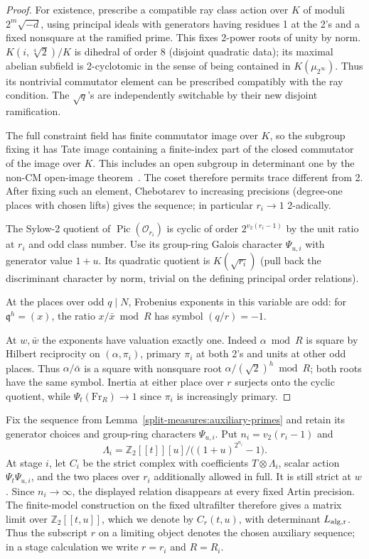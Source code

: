 \begin{proof}
For existence, prescribe a compatible ray class action over \(K\) of moduli \(2^m\sqrt{-d}\), using principal ideals with generators having residues 1 at the 2's and a fixed nonsquare at the ramified prime. This fixes 2-power roots of unity by norm. \(K(i,\sqrt[4]{2})/K\) is dihedral of order 8 (disjoint quadratic data); its maximal abelian subfield is 2-cyclotomic in the sense of being contained in \(K(\mu_{2^\infty})\). Thus its nontrivial commutator element can be prescribed compatibly with the ray condition. The \(\sqrt q\)'s are independently switchable by their new disjoint ramification. 

The full constraint field has finite commutator image over \(K\), so the subgroup fixing it has Tate image containing a finite-index part of the closed commutator of the image over \(K\). This includes an open subgroup in determinant one by the non-CM open-image theorem~\cite{Serre72}. The coset therefore permits trace different from 2. After fixing such an element, Chebotarev to increasing precisions (degree-one places with chosen lifts) gives the sequence; in particular \(r_i\to1\) 2-adically.

The Sylow-2 quotient of \(\operatorname{Pic}(\mathcal O_{r_i})\) is cyclic of order \(2^{v_2(r_i-1)}\) by the unit ratio at \(r_i\) and odd class number. Use its group-ring Galois character \(\Psi_{u,i}\) with generator value \(1+u\). Its quadratic quotient is \(K(\sqrt{r_i})\) (pull back the discriminant character by norm, trivial on the defining principal order relations). 

At the places over odd \(q\mid N\), Frobenius exponents in this variable are odd: for \(\mathfrak q^h=(x)\), the ratio \(x/\bar x\bmod R\) has symbol \((q/r)=-1\). 

At \(w,\bar w\) the exponents have valuation exactly one. Indeed \(\alpha\bmod R\) is square by Hilbert reciprocity on \((\alpha,\pi_i)\), primary \(\pi_i\) at both 2's and units at other odd places. Thus \(\alpha/\bar\alpha\) is a square with nonsquare root \(\alpha/(\sqrt2)^h\bmod R\); both roots have the same symbol. Inertia at either place over \(r\) surjects onto the cyclic quotient, while \(\Psi_t(\mathrm{Fr}_R)\to1\) since \(\pi_i\) is increasingly primary.

\end{proof}

Fix the sequence from Lemma~\ref{split-measures:auxiliary-primes} and
retain its generator choices and group-ring characters \(\Psi_{u,i}\).
Put \(n_i=v_2(r_i-1)\) and
\[
 \Lambda_i=\mathbb Z_2[[t]][u]/\big((1+u)^{2^{n_i}}-1\big).
\]
At stage \(i\), let \(C_i\) be the strict complex with coefficients
\(T\otimes\Lambda_i\), scalar action \(\Psi_t\Psi_{u,i}\), and the
two places over \(r_i\) additionally allowed in full.  It is still strict
at \(w\).  Since \(n_i\to\infty\), the displayed relation disappears
at every fixed Artin precision.  The finite-model construction on the
fixed ultrafilter therefore gives a matrix limit over
\(\mathbb Z_2[[t,u]]\), which we denote by \(C_r(t,u)\), with determinant
\(L_{\rm alg,r}\).  Thus the subscript \(r\) on a limiting object denotes
the chosen auxiliary sequence; in a stage calculation we write
\(r=r_i\) and \(R=R_i\).

